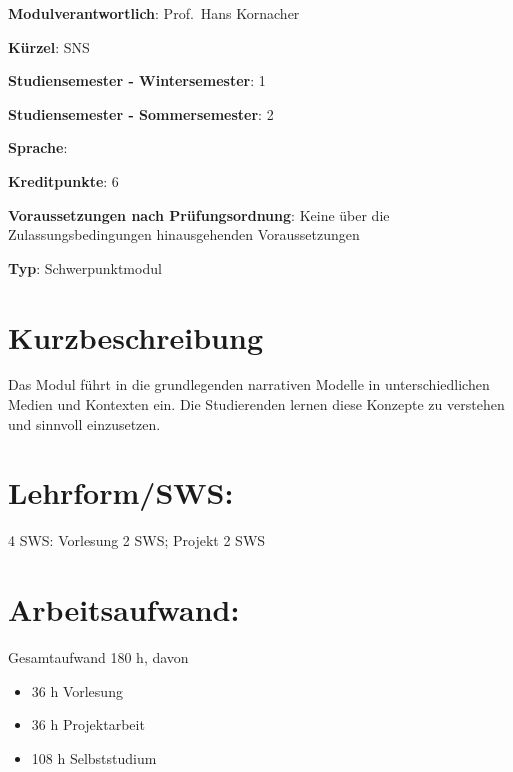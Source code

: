 \begin{modulHead}
\textbf{Modulverantwortlich}: Prof.~Hans
Kornacher
\end{modulHead}
\begin{modulHead}
\textbf{Kürzel}:
SNS
\end{modulHead}
\begin{modulHead}
\textbf{Studiensemester -
Wintersemester}:
1
\end{modulHead}
\begin{modulHead}
\textbf{Studiensemester -
Sommersemester}: 2
\end{modulHead}
\begin{modulHead}
\textbf{Sprache}:
~
\end{modulHead}
\begin{modulHead}
\textbf{Kreditpunkte}:
6
\end{modulHead}
\begin{modulHead}
\textbf{Voraussetzungen nach
Prüfungsordnung}: Keine über die Zulassungsbedingungen hinausgehenden
Voraussetzungen
\end{modulHead}
\begin{modulHead}
\textbf{Typ}:
Schwerpunktmodul
\end{modulHead}


\section*{Kurzbeschreibung}\label{kurzbeschreibung-13}

Das Modul führt in die grundlegenden narrativen Modelle in
unterschiedlichen Medien und Kontexten ein. Die Studierenden lernen
diese Konzepte zu verstehen und sinnvoll einzusetzen.

\section*{Lehrform/SWS:}\label{lehrformsws-18}

4 SWS: Vorlesung 2 SWS; Projekt 2 SWS

\section*{Arbeitsaufwand:}\label{arbeitsaufwand-23}

Gesamtaufwand 180 h, davon

\begin{itemize}
\tightlist
\item
  36 h Vorlesung
\item
  36 h Projektarbeit
\item
  108 h Selbststudium
\end{itemize}

